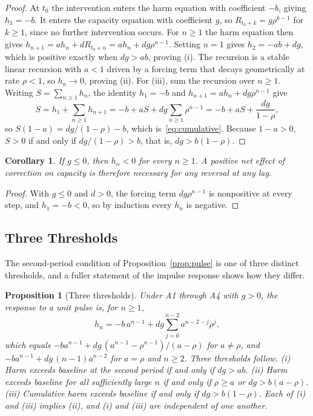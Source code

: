 \documentclass[12pt]{article}
\newtheorem{proposition}{Proposition}
\newtheorem{corollary}{Corollary}
\theoremstyle{remark}
\begin{document}
\begin{proof}
At $t_0$ the intervention enters the harm equation with coefficient $-b$, giving $h_1 = -b$. It enters the capacity equation with coefficient $g$, so $R_{t_0+k} = g\rho^{k-1}$ for $k \ge 1$, since no further intervention occurs. For $n \ge 1$ the harm equation then gives $h_{n+1} = a h_n + d R_{t_0+n} = a h_n + d g \rho^{n-1}$. Setting $n = 1$ gives $h_2 = -ab + dg$, which is positive exactly when $dg > ab$, proving (i). The recursion is a stable linear recursion with $a < 1$ driven by a forcing term that decays geometrically at rate $\rho < 1$, so $h_n \to 0$, proving (ii). For (iii), sum the recursion over $n \ge 1$. Writing $S = \sum_{n\ge1} h_n$, the identity $h_1 = -b$ and $h_{n+1} = a h_n + d g\rho^{n-1}$ give
\[
S = h_1 + \sum_{n \ge 1} h_{n+1} = -b + aS + dg \sum_{n \ge 1} \rho^{n-1} = -b + aS + \frac{dg}{1-\rho},
\]
so $S(1-a) = dg/(1-\rho) - b$, which is~\eqref{eq:cumulative}. Because $1 - a > 0$, $S > 0$ if and only if $dg/(1-\rho) > b$, that is, $dg > b(1-\rho)$.
\end{proof}

\begin{corollary}
\label{cor:necessary}
If $g \le 0$, then $h_n < 0$ for every $n \ge 1$. A positive net effect of correction on capacity is therefore necessary for any reversal at any lag.
\end{corollary}

\begin{proof}
With $g \le 0$ and $d > 0$, the forcing term $d g \rho^{n-1}$ is nonpositive at every step, and $h_1 = -b < 0$, so by induction every $h_n$ is negative.
\end{proof}

\subsection{Three Thresholds}

The second-period condition of Proposition~\ref{prop:pulse} is one of three distinct thresholds, and a fuller statement of the impulse response shows how they differ.

\begin{proposition}[Three thresholds]
\label{prop:thresholds}
Under A1 through A4 with $g > 0$, the response to a unit pulse is, for $n \ge 1$,
\begin{equation}
h_n = -b\,a^{n-1} + dg \sum_{j=0}^{n-2} a^{n-2-j}\rho^{j},
\end{equation}
which equals $-b a^{n-1} + dg\,(a^{n-1} - \rho^{n-1})/(a - \rho)$ for $a \ne \rho$, and $-b a^{n-1} + dg\,(n-1)a^{n-2}$ for $a = \rho$ and $n \ge 2$. Three thresholds follow. (i) Harm exceeds baseline at the second period if and only if $dg > ab$. (ii) Harm exceeds baseline for all sufficiently large $n$ if and only if $\rho \ge a$ or $dg > b(a-\rho)$. (iii) Cumulative harm exceeds baseline if and only if $dg > b(1-\rho)$. Each of (i) and (iii) implies (ii), and (i) and (iii) are independent of one another.
\end{proposition}
\end{document}

